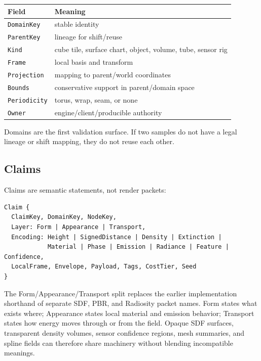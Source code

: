 \documentclass[11pt]{article}
\begin{document}
\begin{center}
\begin{tabular}{ll}
\toprule
Field & Meaning \\
\midrule
\texttt{DomainKey} & stable identity \\
\texttt{ParentKey} & lineage for shift/reuse \\
\texttt{Kind} & cube tile, surface chart, object, volume, tube, sensor rig \\
\texttt{Frame} & local basis and transform \\
\texttt{Projection} & mapping to parent/world coordinates \\
\texttt{Bounds} & conservative support in parent/domain space \\
\texttt{Periodicity} & torus, wrap, seam, or none \\
\texttt{Owner} & engine/client/producible authority \\
\bottomrule
\end{tabular}
\end{center}

Domains are the first validation surface.  If two samples do not have a legal
lineage or shift mapping, they do not reuse each other.

\subsection{Claims}

Claims are semantic statements, not render packets:

\begin{center}
\begin{minipage}{0.86\linewidth}
\small
\begin{verbatim}
Claim {
  ClaimKey, DomainKey, NodeKey,
  Layer: Form | Appearance | Transport,
  Encoding: Height | SignedDistance | Density | Extinction |
            Material | Phase | Emission | Radiance | Feature | Confidence,
  LocalFrame, Envelope, Payload, Tags, CostTier, Seed
}
\end{verbatim}
\end{minipage}
\end{center}

The Form/Appearance/Transport split replaces the earlier implementation
shorthand of separate SDF, PBR, and Radiosity packet names.  Form states what exists where; Appearance
states local material and emission behavior; Transport states how energy moves
through or from the field.  Opaque SDF surfaces, transparent density volumes,
sensor confidence regions, mesh summaries, and spline fields can therefore
share machinery without blending incompatible meanings.
\end{document}
